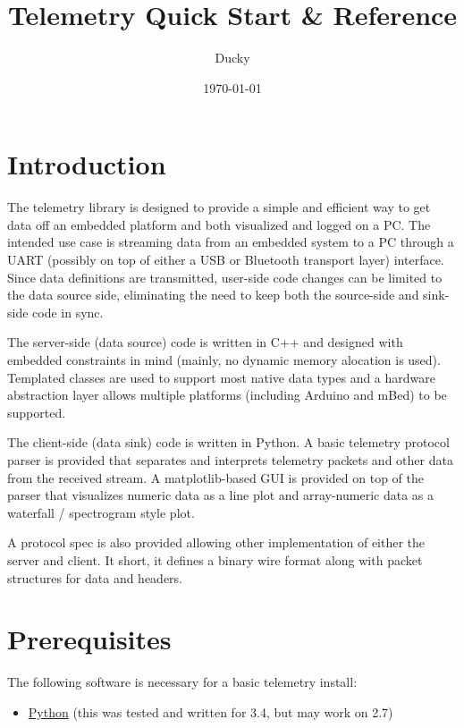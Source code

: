 \documentclass[11pt]{article}
\title{\textbf{Telemetry Quick Start \& Reference}}
\author{Ducky}
\date{\today}
\begin{document}
\maketitle

\section{Introduction}
The telemetry library is designed to provide a simple and efficient way to get data off an embedded platform and both visualized and logged on a PC. The intended use case is streaming data from an embedded system to a PC through a UART (possibly on top of either a USB or Bluetooth transport layer) interface. Since data definitions are transmitted, user-side code changes can be limited to the data source side, eliminating the need to keep both the source-side and sink-side code in sync.

The server-side (data source) code is written in C++ and designed with embedded constraints in mind (mainly, no dynamic memory alocation is used). Templated classes are used to support most native data types and a hardware abstraction layer allows multiple platforms (including Arduino and mBed) to be supported.

The client-side (data sink) code is written in Python. A basic telemetry protocol parser is provided that separates and interprets telemetry packets and other data from the received stream. A matplotlib-based GUI is provided on top of the parser that visualizes numeric data as a line plot and array-numeric data as a waterfall / spectrogram style plot.

A protocol spec is also provided allowing other implementation of either the server and client. It short, it defines a binary wire format along with packet structures for data and headers.

\section{Prerequisites}
The following software is necessary for a basic telemetry install:
\begin{itemize}
  \item \href{https://www.python.org/downloads/}{Python} (this was tested and written for 3.4, but may work on 2.7)
\end{itemize}
\end{document}
